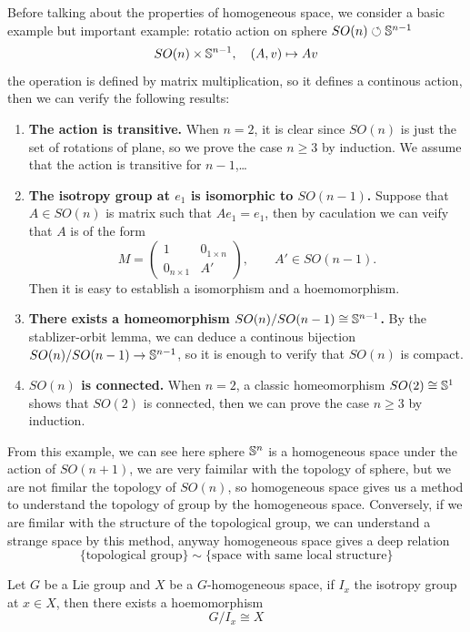 Before talking about the properties of homogeneous space, we consider a basic example but important example: rotatio action on sphere \(SO(n) \circlearrowleft \mathbb{S}^{n-1}\)
\[SO(n) \times \mathbb{S}^{n-1}, \quad (A,v) \mapsto Av\]
the operation is defined by matrix multiplication, so it defines a continous action, then we can verify the following results:
\begin{enumerate}
    \item \textbf{The action is transitive.} When \(n = 2\), it is clear since \(SO(n)\) is just the set of rotations of plane, so we prove the case \(n \geq 3\) by induction. We assume that the action is transitive for \(n-1\),\dots
    \item \textbf{The isotropy group at \(e_1\) is isomorphic to \(SO(n-1)\).} Suppose that \(A \in SO(n)\) is matrix such that \(Ae_1 = e_1\), then by caculation we can veify that \(A\) is of the form
    \[
M=
\begin{pmatrix}
1 & 0_{1\times n} \\
0_{n\times 1} & A'
\end{pmatrix},
\qquad A' \in SO(n-1).
\]
    Then it is easy to establish a isomorphism and a hoemomorphism.
    \item \textbf{There exists a homeomorphism \(SO(n)/SO(n-1) \cong \mathbb{S}^{n-1}\).} By the stablizer-orbit lemma, we can deduce a continous bijection \(SO(n)/SO(n-1) \to \mathbb{S}^{n-1}\), so it is enough to verify that \(SO(n)\) is compact.
    \item \textbf{\(SO(n)\) is connected.} When \(n = 2\), a classic homeomorphism \(SO(2) \cong \mathbb{S}^1\) shows that \(SO(2)\) is connected, then we can prove the case \(n \geq 3\) by induction.
\end{enumerate}

From this example, we can see here sphere \(\mathbb{S}^n\) is a homogeneous space under the action of \(SO(n+1)\), we are very faimilar with the topology of sphere, but we are not fimilar the topology of \(SO(n)\), so homogeneous space gives us a method to understand the topology of group by the homogeneous space. Conversely, if we are fimilar with the structure of the topological group, we can understand a strange space by this method, anyway homogeneous space gives a deep relation
\[\{\text{topological group}\} \sim \{\text{space with same local structure}\}\]

\begin{colortheorem}
    Let \(G\) be a Lie group and \(X\) be a \(G\)-homogeneous space, if \(I_x\) the isotropy group at \(x \in X\), then there exists a hoemomorphism
    \[G/I_x \cong X\]
\end{colortheorem}












